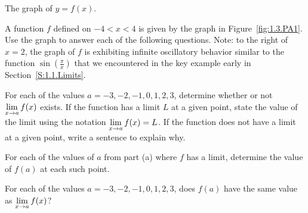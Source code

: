 \begin{marginfigure}[8cm]
\caption{The graph of $y = f(x)$.} \label{fig:1.3.PA1}
\end{marginfigure}

\begin{pa} \label{PA:1.3}
A function $f$ defined on $-4 < x < 4$ is given by the graph in Figure~\ref{fig:1.3.PA1}.  Use the graph to answer each of the following questions.  Note: to the right of $x = 2$, the graph of $f$ is exhibiting infinite oscillatory behavior similar to the function $\sin(\frac{\pi}{x})$ that we encountered in the key example early in Section~\ref{S:1.1.Limits}.

\ba
\item For each of the values $a = -3, -2, -1, 0, 1, 2, 3$, determine whether or not $\displaystyle \lim_{x \to a} f(x)$ exists.  If the function has a limit $L$ at a given point, state the value of the limit using the notation $\displaystyle \lim_{x \to a} f(x) = L$.  If the function does not have a limit at a given point, write a sentence to explain why.

\item For each of the values of $a$ from part (a) where $f$ has a limit, determine the value of $f(a)$ at each such point.  

\item For each of the values $a = -3, -2, -1, 0, 1, 2, 3$,  does $f(a)$ have the same value as $\displaystyle \lim_{x \to a} f(x)$?
\ea
\end{pa} 

\afterpa

